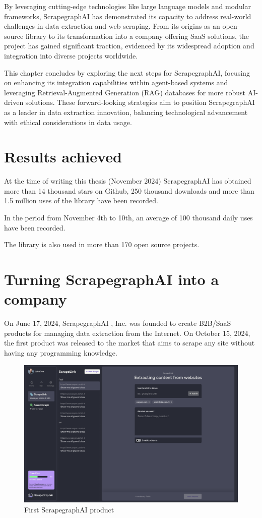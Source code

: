 By leveraging cutting-edge technologies like large language models and modular frameworks, ScrapegraphAI has demonstrated its capacity to address real-world challenges in data extraction and web scraping. From its origins as an open-source library to its transformation into a company offering SaaS solutions, the project has gained significant traction, evidenced by its widespread adoption and integration into diverse projects worldwide.

This chapter concludes by exploring the next steps for ScrapegraphAI, focusing on enhancing its integration capabilities within agent-based systems and leveraging Retrieval-Augmented Generation (RAG) databases for more robust AI-driven solutions. These forward-looking strategies aim to position ScrapegraphAI as a leader in data extraction innovation, balancing technological advancement with ethical considerations in data usage.
\section{Results achieved}
At the time of writing this thesis (November 2024) ScrapegraphAI  has obtained more than 14 thousand stars on Github, 250 thousand downloads and more than 1.5 million uses of the library have been recorded. 

In the period from November 4th to 10th, an average of 100 thousand daily uses have been recorded.

The library is also used in more than 170 open source projects.
\section{Turning ScrapegraphAI  into a company}
On June 17, 2024, ScrapegraphAI , Inc. was founded to create B2B/SaaS products for managing data extraction from the Internet.
On October 15, 2024, the first product was released to the market that aims to scrape any site without having any programming knowledge.

\begin{figure}[h!]
    \centering
    \includegraphics[width=1\linewidth]{Assets/webapp.png}
    \caption{First ScrapegraphAI  product}
    \label{fig:enter-label}
\end{figure}

